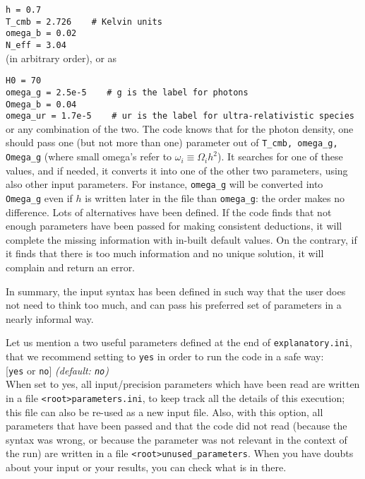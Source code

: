\documentclass{article}
\begin{document}
\vspace{0.5cm}

\noindent 
{\tt h = 0.7}\\
{\tt T\_cmb = 2.726 ~~~\# Kelvin units}\\
{\tt omega\_b = 0.02}\\
{\tt N\_eff = 3.04}\\


\noindent
(in arbitrary order), or as

\vspace{0.5cm}

\noindent 
{\tt H0 = 70}\\ {\tt omega\_g = 2.5e-5 ~~~\# g is the label for
photons}\\ {\tt Omega\_b = 0.04}\\ {\tt omega\_ur = 1.7e-5 ~~~\# ur is
the label for ultra-relativistic species}\\


\noindent
or any combination of the two. The code knows that for the photon
density, one should pass one (but not more than one) parameter out of
{\tt T\_cmb, omega\_g, Omega\_g} (where small omega's refer to
$\omega_i \equiv \Omega_i h^2$). It searches for one of these values,
and if needed, it converts it into one of the other two parameters,
using also other input parameters. For instance, {\tt omega\_g} will
be converted into {\tt Omega\_g} even if $h$ is written later in the
file than {\tt omega\_g}: the order makes no difference.  Lots of
alternatives have been defined. If the code finds that not enough
parameters have been passed for making consistent deductions, it will
complete the missing information with in-built default values. On the
contrary, if it finds that there is too much information and no unique
solution, it will complain and return an error.

In summary, the input syntax has been defined in such way that the
user does not need to think too much, and can pass his preferred set
of parameters in a nearly informal way.

Let us mention a two useful parameters defined at the end of {\tt explanatory.ini}, that we recommend setting to {\tt yes} in order to run the code in a safe way:\\

 [{\tt yes} or {\tt no}] {\it (default: {\tt no})}\\

When set to yes, all input/precision parameters which have been read
are written in a file {\tt <root>parameters.ini}, to keep track all the details of this execution; this file can also be re-used as a new input file. Also, with this option, all parameters that have been passed and that the code did not read (because the syntax was wrong, or because the parameter was not relevant in the context of the run) are written in a file {\tt <root>unused\_parameters}. When you have doubts about your input or your results, you can check what is in there.\\
\end{document}
